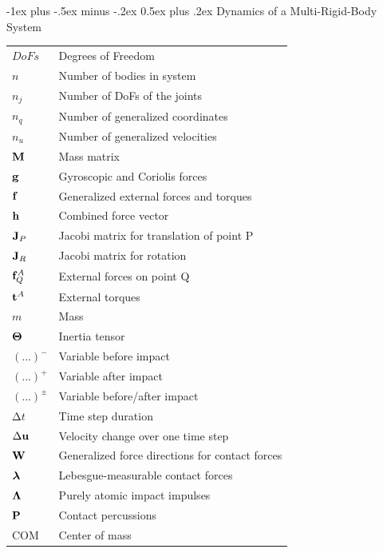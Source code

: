 \documentclass[10pt,landscape,a4paper]{article}
\makeatletter
\renewcommand{\section}{\@startsection{section}{1}{0mm}%
                               {-1ex plus -.5ex minus -.2ex}%
                                {0.5ex plus .2ex}%
                                {\normalfont\large\bfseries}}
\makeatother
\begin{document}
\begin{multicols}{2}
\newpage
\section{Dynamics of a Multi-Rigid-Body System}

\begin{tabular}{@{}ll@{}}
  $DoFs$				& Degrees of Freedom \\
  $n$					& Number of bodies in system \\
  $n_j$ 				& Number of DoFs of the joints \\
  $n_q$ 				& Number of generalized coordinates \\
  $n_u$ 				& Number of generalized velocities \\
  $\mathbf M$					& Mass matrix \\
  $\mathbf g$					& Gyroscopic and Coriolis forces \\
  $\mathbf f$					& Generalized external forces and torques \\
  $\mathbf h$					& Combined force vector \\
  $\mathbf J_P$				& Jacobi matrix for translation of point P \\
  $\mathbf J_{R}$				& Jacobi matrix for rotation \\
  $\mathbf f_Q^A$				& External forces on point Q \\
  $\mathbf t^A$				& External torques \\
  $m$ 					& Mass \\
  $\mathbf \Theta$ 				& Inertia tensor \\
  $(...)^-$				& Variable before impact \\
  $(...)^+$				& Variable after impact \\
  $(...)^\pm$			& Variable before/after impact \\
  $\mathrm{\Delta} t$	& Time step duration \\
  $\mathrm{\Delta} \mathbf u$	& Velocity change over one time step \\
  $\mathbf W$					& Generalized force directions for contact forces \\
  $\mbox{\boldmath $\lambda$}$				& Lebesgue-measurable contact forces \\
  $\mathbf \Lambda$				& Purely atomic impact impulses \\
  $\mathbf P$					& Contact percussions \\
  $\mathrm{COM}$		& Center of mass\\
\end{tabular}



\end{multicols}
\end{document}
